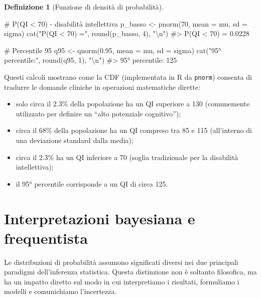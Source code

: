 \documentclass[
  italian,
  letterpaper,
  a4paper,
  11pt,
  open=any]{scrbook}
\newenvironment{Shaded}{\begin{snugshade}}{\end{snugshade}}
\newcommand{\AttributeTok}[1]{\textcolor[rgb]{0.40,0.45,0.13}{#1}}
\newcommand{\CommentTok}[1]{\textcolor[rgb]{0.37,0.37,0.37}{#1}}
\newcommand{\DecValTok}[1]{\textcolor[rgb]{0.68,0.00,0.00}{#1}}
\newcommand{\FloatTok}[1]{\textcolor[rgb]{0.68,0.00,0.00}{#1}}
\newcommand{\FunctionTok}[1]{\textcolor[rgb]{0.28,0.35,0.67}{#1}}
\newcommand{\NormalTok}[1]{\textcolor[rgb]{0.00,0.23,0.31}{#1}}
\newcommand{\OtherTok}[1]{\textcolor[rgb]{0.00,0.23,0.31}{#1}}
\newcommand{\SpecialCharTok}[1]{\textcolor[rgb]{0.37,0.37,0.37}{#1}}
\newcommand{\StringTok}[1]{\textcolor[rgb]{0.13,0.47,0.30}{#1}}
\providecommand{\tightlist}{%
  \setlength{\itemsep}{0pt}\setlength{\parskip}{0pt}}
\theoremstyle{plain}
\theoremstyle{definition}
\theoremstyle{definition}
\newtheorem{definition}{Definizione}[chapter]
\theoremstyle{remark}
\begin{document}
\begin{definition}[Funzione di densità di
probabilità]
\begin{tcolorbox}
\begin{Shaded}
\begin{Highlighting}[]
\CommentTok{\# P(QI \textless{} 70) {-} disabilità intellettiva}
\NormalTok{p\_basso }\OtherTok{\textless{}{-}} \FunctionTok{pnorm}\NormalTok{(}\DecValTok{70}\NormalTok{, }\AttributeTok{mean =}\NormalTok{ mu, }\AttributeTok{sd =}\NormalTok{ sigma)}
\FunctionTok{cat}\NormalTok{(}\StringTok{"P(QI \textless{} 70) ="}\NormalTok{, }\FunctionTok{round}\NormalTok{(p\_basso, }\DecValTok{4}\NormalTok{), }\StringTok{"}\SpecialCharTok{\textbackslash{}n}\StringTok{"}\NormalTok{)}
\CommentTok{\#\textgreater{} P(QI \textless{} 70) = 0.0228}

\CommentTok{\# Percentile 95}
\NormalTok{q95 }\OtherTok{\textless{}{-}} \FunctionTok{qnorm}\NormalTok{(}\FloatTok{0.95}\NormalTok{, }\AttributeTok{mean =}\NormalTok{ mu, }\AttributeTok{sd =}\NormalTok{ sigma)}
\FunctionTok{cat}\NormalTok{(}\StringTok{"95° percentile:"}\NormalTok{, }\FunctionTok{round}\NormalTok{(q95, }\DecValTok{1}\NormalTok{), }\StringTok{"}\SpecialCharTok{\textbackslash{}n}\StringTok{"}\NormalTok{)}
\CommentTok{\#\textgreater{} 95° percentile: 125}
\end{Highlighting}
\end{Shaded}

Questi calcoli mostrano come la CDF (implementata in R da
\texttt{pnorm}) consenta di tradurre le domande cliniche in operazioni
matematiche dirette:

\begin{itemize}
\tightlist
\item
  solo circa il 2.3\% della popolazione ha un QI superiore a 130
  (comunemente utilizzato per definire un ``alto potenziale
  cognitivo'');
\item
  circa il 68\% della popolazione ha un QI compreso tra 85 e 115
  (all'interno di una deviazione standard dalla media);
\item
  circa il 2.3\% ha un QI inferiore a 70 (soglia tradizionale per la
  disabilità intellettiva);
\item
  il 95° percentile corrisponde a un QI di circa 125.
\end{itemize}

\end{tcolorbox}

\section{Interpretazioni bayesiana e
frequentista}\label{interpretazioni-bayesiana-e-frequentista}

Le distribuzioni di probabilità assumono significati diversi nei due
principali paradigmi dell'inferenza statistica. Questa distinzione non è
soltanto filosofica, ma ha un impatto diretto sul modo in cui
interpretiamo i risultati, formuliamo i modelli e comunichiamo
l'incertezza.


\end{definition}
\end{document}
